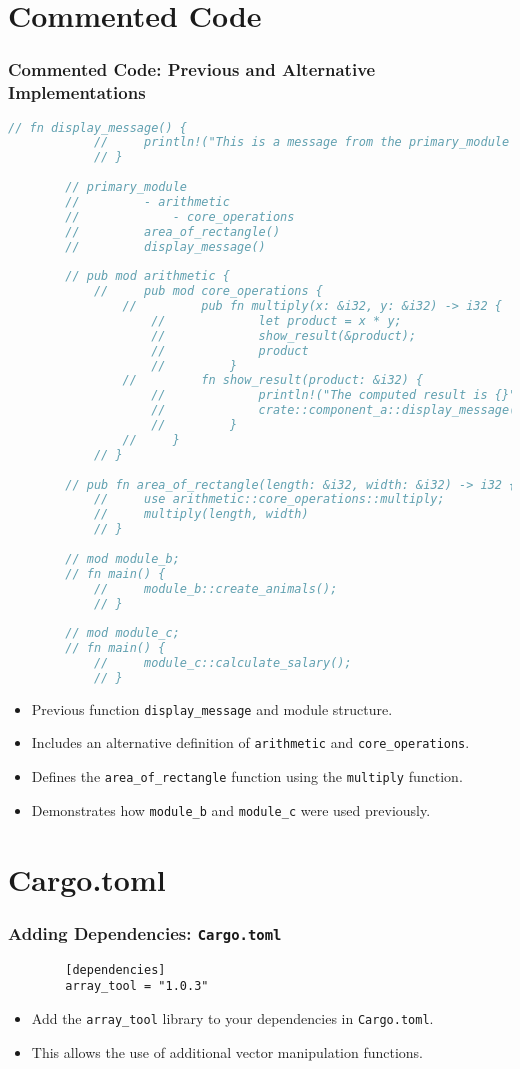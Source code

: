 \documentclass[aspectratio=169, table]{beamer}
\begin{document}
\section{Commented Code}
\begin{frame}[fragile]
	\frametitle{Commented Code: Previous and Alternative Implementations}
	\begin{lstlisting}[language=Rust]
		// fn display_message() {
			//     println!("This is a message from the primary_module crate");
			// }
		
		// primary_module
		//         - arithmetic
		//             - core_operations
		//         area_of_rectangle()
		//         display_message()
		
		// pub mod arithmetic {
			//     pub mod core_operations {
				//         pub fn multiply(x: &i32, y: &i32) -> i32 {
					//             let product = x * y;
					//             show_result(&product);
					//             product
					//         }
				//         fn show_result(product: &i32) {
					//             println!("The computed result is {}", product);
					//             crate::component_a::display_message();
					//         }
				//     }
			// }
		
		// pub fn area_of_rectangle(length: &i32, width: &i32) -> i32 {
			//     use arithmetic::core_operations::multiply;
			//     multiply(length, width)
			// }
		
		// mod module_b;
		// fn main() {
			//     module_b::create_animals();
			// }
		
		// mod module_c;
		// fn main() {
			//     module_c::calculate_salary();
			// }
	\end{lstlisting}
	\begin{itemize}
		\item Previous function \texttt{display\_message} and module structure.
		\item Includes an alternative definition of \texttt{arithmetic} and \texttt{core\_operations}.
		\item Defines the \texttt{area\_of\_rectangle} function using the \texttt{multiply} function.
		\item Demonstrates how \texttt{module\_b} and \texttt{module\_c} were used previously.
	\end{itemize}
\end{frame}

\section{Cargo.toml}
\begin{frame}[fragile]
	\frametitle{Adding Dependencies: \texttt{Cargo.toml}}
	\begin{lstlisting}
		[dependencies]
		array_tool = "1.0.3"
	\end{lstlisting}
	\begin{itemize}
		\item Add the \texttt{array\_tool} library to your dependencies in \texttt{Cargo.toml}.
		\item This allows the use of additional vector manipulation functions.
	\end{itemize}
\end{frame}
\end{document}
